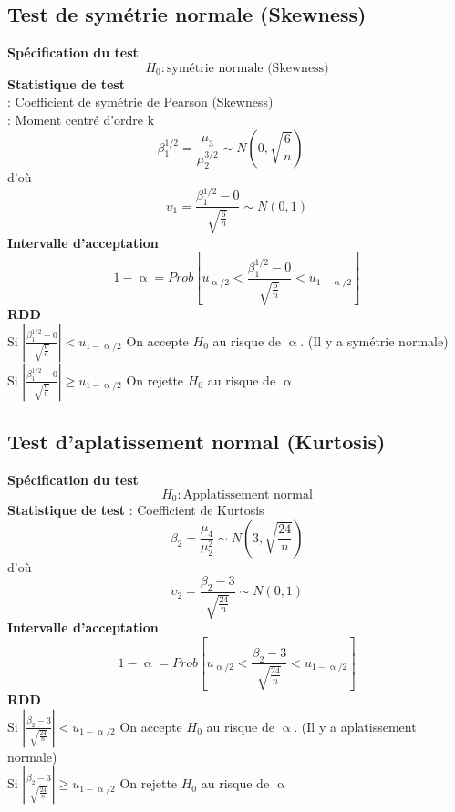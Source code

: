 \documentclass{article}
\begin{document}
\subsection{Test de symétrie normale (Skewness)}
\textbf{Spécification du test}
\begin{equation*}
	H_0 : \text{symétrie normale (Skewness)}
\end{equation*}
\textbf{Statistique de test}\\	
  : Coefficient de symétrie de Pearson (Skewness) \\
 : Moment centré d'ordre k
\begin{equation*}
	\beta_1^{1/2} = \frac{\mu_3}{\mu_2^{3/2}} \sim N\left(0, \sqrt{\frac{6}{n}}\right) \quad 
\end{equation*}
d'où
\begin{equation*}
	\upsilon_1 = \frac{\beta_1^{1/2} - 0 }{\sqrt{\frac{6}{n}}} \sim N(0,1)
\end{equation*}
\textbf{Intervalle d'acceptation}
\begin{equation*}
1 - \upalpha = Prob \left[u_{\upalpha/2}< \frac{ \beta_1^{1/2} - 0 }{\sqrt{\frac{6}{n}}}<u_{1 - \upalpha/2}\right]
\end{equation*}
\textbf{RDD} \\
Si $\left| \frac{ \beta_1^{1/2} - 0 }{\sqrt{\frac{6}{n}}} \right| <u_{1 - \upalpha/2} $ On accepte $H_0$ au risque de $\upalpha$. {\color{red} (Il y a symétrie normale)} \\
Si $\left| \frac{ \beta_1^{1/2} - 0 }{\sqrt{\frac{6}{n}}} \right| \geq u_{1 - \upalpha/2} $ On rejette $H_0$ au risque de $\upalpha$

\subsection{Test d'aplatissement normal (Kurtosis)}
\textbf{Spécification du test}
\begin{equation*}
	H_0 : \text{Applatissement normal}
\end{equation*}
\textbf{Statistique de test}
 : Coefficient de Kurtosis
\begin{equation*}
	\beta_2 = \frac{\mu_4}{\mu_2^2} \sim N\left(3, \sqrt{\frac{24}{n}}\right)
\end{equation*}
d'où
\begin{equation*}
	\upsilon_2 = \frac{\beta_2 - 3 }{\sqrt{\frac{24}{n}}} \sim N(0,1)
\end{equation*}
\textbf{Intervalle d'acceptation}
\begin{equation*}
1 - \upalpha = Prob \left[u_{\upalpha/2}<  \frac{\beta_2 - 3 }{\sqrt{\frac{24}{n}}}<u_{1 - \upalpha/2}\right]
\end{equation*}
\textbf{RDD} \\
Si $\left|  \frac{\beta_2- 3 }{\sqrt{\frac{24}{n}}} \right| <u_{1 - \upalpha/2} $ On accepte $H_0$ au risque de $\upalpha$. {\color{red} (Il y a aplatissement normale)} \\
Si $\left|  \frac{\beta_2 - 3 }{\sqrt{\frac{24}{n}}} \right| \geq u_{1 - \upalpha/2} $ On rejette $H_0$ au risque de $\upalpha$ 
\end{document}
